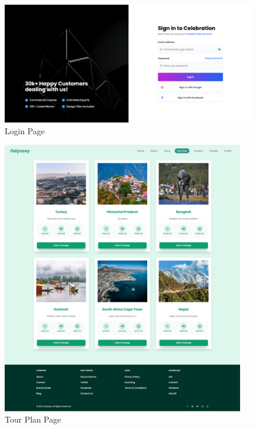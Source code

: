 \begin{figure}[H]
    \centering
    \includegraphics[width=1.0\textwidth]{./figures/frontend/2.png}
    \caption{Login Page}
    \label{fig:login_page}
\end{figure}

\begin{figure}[H]
    \centering
    \includegraphics[width=0.95\textwidth]{./figures/frontend/3.png}
    \caption{Tour Plan Page}
    \label{fig:tour_plan}
\end{figure}


